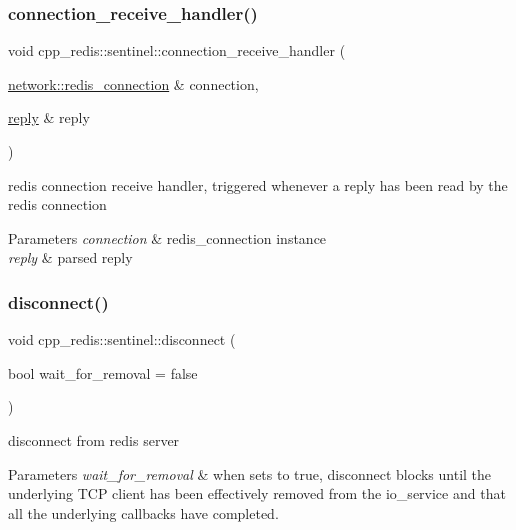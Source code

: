 \subsubsection{\texorpdfstring{connection\+\_\+receive\+\_\+handler()}{connection\_receive\_handler()}}
{\footnotesize\ttfamily void cpp\+\_\+redis\+::sentinel\+::connection\+\_\+receive\+\_\+handler (\begin{DoxyParamCaption}\item[{\hyperlink{classcpp__redis_1_1network_1_1redis__connection}{network\+::redis\+\_\+connection} \&}]{connection,  }\item[{\hyperlink{classcpp__redis_1_1reply}{reply} \&}]{reply }\end{DoxyParamCaption})\hspace{0.3cm}{\ttfamily [private]}}

redis connection receive handler, triggered whenever a reply has been read by the redis connection


\begin{DoxyParams}{Parameters}
{\em connection} & redis\+\_\+connection instance \\
\hline
{\em reply} & parsed reply \\
\hline
\end{DoxyParams}
\mbox{\label{classcpp__redis_1_1sentinel_af607d8c5a20ada35daad251f1b1b2f68}} 
\subsubsection{\texorpdfstring{disconnect()}{disconnect()}}
{\footnotesize\ttfamily void cpp\+\_\+redis\+::sentinel\+::disconnect (\begin{DoxyParamCaption}\item[{bool}]{wait\+\_\+for\+\_\+removal = {\ttfamily false} }\end{DoxyParamCaption})}

disconnect from redis server


\begin{DoxyParams}{Parameters}
{\em wait\+\_\+for\+\_\+removal} & when sets to true, disconnect blocks until the underlying T\+CP client has been effectively removed from the io\+\_\+service and that all the underlying callbacks have completed. \\
\hline
\end{DoxyParams}
\mbox{\label{classcpp__redis_1_1sentinel_abd4ee07b5a17ca15b74d25702687e53a}} 
